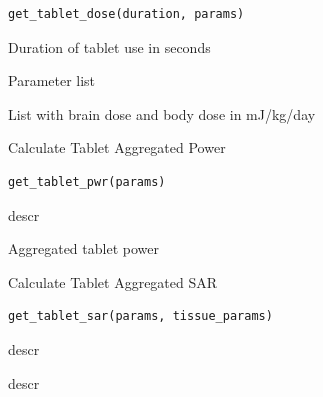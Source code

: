 \documentclass[a4paper]{book}
\begin{document}
%
\begin{Usage}
\begin{verbatim}
get_tablet_dose(duration, params)
\end{verbatim}
\end{Usage}
%
\begin{Arguments}
\begin{ldescription}
\item[\code{duration}] Duration of tablet use in seconds

\item[\code{params}] Parameter list
\end{ldescription}
\end{Arguments}
%
\begin{Value}
List with brain dose and body dose in mJ/kg/day
\end{Value}
%
\begin{Description}
Calculate Tablet Aggregated Power
\end{Description}
%
\begin{Usage}
\begin{verbatim}
get_tablet_pwr(params)
\end{verbatim}
\end{Usage}
%
\begin{Arguments}
\begin{ldescription}
\item[\code{params}] descr
\end{ldescription}
\end{Arguments}
%
\begin{Value}
Aggregated tablet power
\end{Value}
%
\begin{Description}
Calculate Tablet Aggregated SAR
\end{Description}
%
\begin{Usage}
\begin{verbatim}
get_tablet_sar(params, tissue_params)
\end{verbatim}
\end{Usage}
%
\begin{Arguments}
\begin{ldescription}
\item[\code{params}] descr

\item[\code{tissue\_params}] descr
\end{ldescription}
\end{Arguments}
\end{document}
